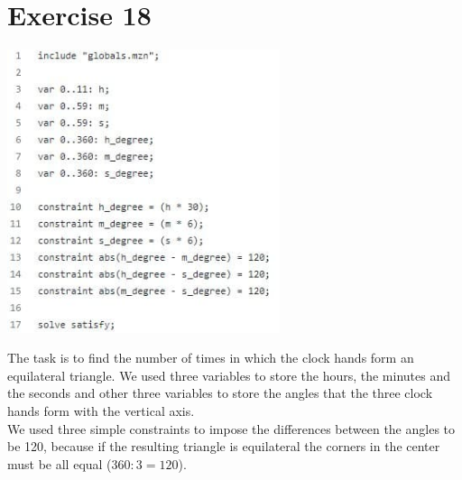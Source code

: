 \documentclass{article}
\begin{document}
\section{Exercise 18}
\vspace{0.2cm}
\includegraphics[width=8cm]{img/Es18.jpg}
\vspace{0.2cm}

The task is to find the number of times in which the clock hands form an equilateral triangle. We used three variables to store the hours, the minutes and the seconds and other three variables to store the angles that the three clock hands form with the vertical axis.\\ We used three simple constraints to impose the differences between the angles to be 120, because if the resulting triangle is equilateral the corners in the center must be all equal ($360:3 = 120$).
\end{document}
